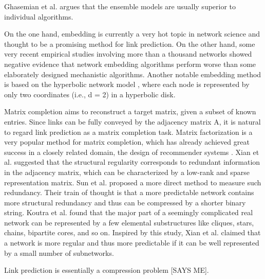 Ghasemian et al. \cite{ghasemian2020stacking} argues that the ensemble models are usually superior to individual algorithms.

On the one hand, embedding is currently a very hot topic in network science and thought to be a promising method for link prediction. On the other hand, some very recent empirical studies \cite{muscoloni2022adaptive, mara2020benchmarking, ghasemian2020stacking} involving more than a thousand networks showed negative evidence that network embedding algorithms perform worse than some elaborately designed mechanistic algorithms.
Another notable embedding method is based on the hyperbolic network model \cite{krioukov2010hyperbolic, papadopoulos2012popularity}, where each node is represented by only two coordinates (i.e., d = 2) in a hyperbolic disk.

Matrix completion aims to reconstruct a target matrix, given a subset of known entries. Since links can be fully conveyed by the adjacency matrix A, it is natural to regard link prediction as a matrix completion task. Matrix factorization is a very popular method for matrix completion, which has already achieved great success in a closely related domain, the design of recommender systems \cite{koren2009matrix}.
Xian et al. \cite{xian2020netsre} suggested that the structural regularity corresponds to redundant information in the adjacency matrix, which can be characterized by a low-rank and sparse representation matrix. Sun et al. \cite{sun2020revealing} proposed a more direct method to measure such redundancy. Their train of thought is that a more predictable network contains more structural redundancy and thus can be compressed by a shorter binary string.
Koutra et al. \cite{koutra2015summarizing} found that the major part of a seemingly complicated real network can be represented by a few elemental substructures like cliques, stars, chains, bipartite cores, and so on. Inspired by this study, Xian et al. \cite{xian2020netsre} claimed that a network is more regular and thus more predictable if it can be well represented by a small number of subnetworks. 

Link prediction is essentially a compression problem [SAYS ME].






